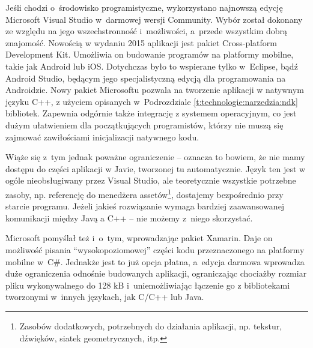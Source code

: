 		Jeśli chodzi o~środowisko programistyczne, wykorzystano najnowszą edycję Microsoft Visual Studio w~darmowej wersji Community. Wybór został dokonany ze względu na jego wszechstronność i~możliwości, a~przede wszystkim dobrą znajomość. Nowością w wydaniu 2015 aplikacji jest pakiet Cross-platform Development Kit. Umożliwia on budowanie programów na platformy mobilne, takie jak Android lub iOS. Dotychczas było to wspierane tylko w~Eclipse, bądź Android Studio, będącym jego specjalistyczną edycją dla programowania na Androidzie. Nowy pakiet Microsoftu pozwala na tworzenie aplikacji w natywnym języku C++, z użyciem opisanych w~Podrozdziale \ref{t:technologie:narzedzia:ndk} bibliotek. Zapewnia odgórnie także integrację z systemem operacyjnym, co jest dużym ułatwieniem dla początkujących programistów, którzy nie muszą się zajmować zawiłościami inicjalizacji natywnego kodu. 
		
		Wiąże się z~tym jednak poważne ograniczenie -- oznacza to bowiem, że nie mamy dostępu do części aplikacji w Javie, tworzonej tu automatycznie. Język ten jest w ogóle nieobsługiwany przez Visual Studio, ale teoretycznie wszystkie potrzebne zasoby, np. referencję do menedżera assetów\footnote{Zasobów dodatkowych, potrzebnych do działania aplikacji, np. tekstur, dźwięków, siatek geometrycznych, itp.}, dostajemy bezpośrednio przy starcie programu. Jeżeli jakieś rozwiązanie wymaga bardziej zaawansowanej komunikacji między Javą a C++ -- nie możemy z~niego skorzystać.
		
		Microsoft pomyślał też i~o~tym, wprowadzając pakiet Xamarin. Daje on możliwość pisania ``wysokopoziomowej'' części kodu przeznaczonego na platformy mobilne w~C\#. Jednakże jest to już opcja płatna, a~edycja darmowa wprowadza duże ograniczenia odnośnie budowanych aplikacji, ograniczając chociażby rozmiar pliku wykonywalnego do 128 kB i~uniemożliwiając łączenie go z bibliotekami tworzonymi w~innych językach, jak C/C++ lub Java.
		